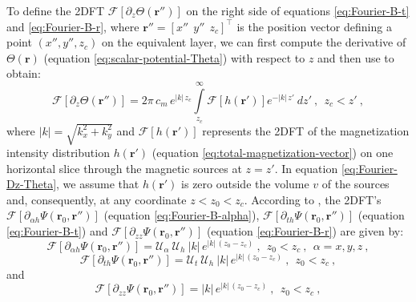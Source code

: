 To define the 2DFT $\mathcal{F}\left[ \partial_{z} \Theta(\mathbf{r}'') \right]$ 
on the right side of equations \ref{eq:Fourier-B-t} and \ref{eq:Fourier-B-r}, 
where $\mathbf{r}'' = \left[x'' \:\: y'' \:\: z_{c} \right]^{\top}$ is the 
position vector defining a point $(x'', y'', z_{c})$ on the equivalent layer, 
we can first compute the derivative of $\Theta(\mathbf{r})$ (equation
\ref{eq:scalar-potential-Theta}) with respect to $z$ and then use 
\citet[][ p. 297]{blakely1996} to obtain:
\begin{equation}
\mathcal{F}\left[ \partial_{z} \Theta(\mathbf{r}'') \right] 
= 2\pi \, c_{m} \, e^{|k| \, z_{c}} 
\int\limits_{z_{c}}^{\infty} 
\mathcal{F}\left[ h(\mathbf{r}') \right] e^{-|k| \, z'} \:
dz' \: , \:\: z_{c} < z' \: ,
\label{eq:Fourier-Dz-Theta}
\end{equation}
where $|k| = \sqrt{k_{x}^{2} + k_{y}^{2}}$ and 
$\mathcal{F}\left[ h(\mathbf{r}') \right]$ represents the 
2DFT of the magnetization intensity distribution $h(\mathbf{r}')$
(equation \ref{eq:total-magnetization-vector}) on one horizontal slice
through the magnetic sources at $z = z'$.
In equation \ref{eq:Fourier-Dz-Theta}, we assume that 
$h(\mathbf{r}')$ is zero outside the volume $v$ of the sources
and, consequently, at any coordinate $z < z_{0} < z_{c}$.
According to \citet[][ p. 278]{blakely1996}, the 2DFT's 
$\mathcal{F}\left[ \partial_{\alpha h} \Psi(\mathbf{r}_{0}, \mathbf{r}'') \right]$ 
(equation \ref{eq:Fourier-B-alpha}),
$\mathcal{F}\left[ \partial_{th} \Psi(\mathbf{r}_{0}, \mathbf{r}'') \right]$ 
(equation \ref{eq:Fourier-B-t}) and 
$\mathcal{F}\left[ \partial_{zz} \Psi(\mathbf{r}_{0}, \mathbf{r}'') \right]$ 
(equation \ref{eq:Fourier-B-r}) are given by:
\begin{equation}
\mathcal{F}\left[ \partial_{\alpha h} \Psi(\mathbf{r}_{0}, \mathbf{r}'') \right] = 
\mathcal{U}_{\alpha} \: \mathcal{U}_{h} \: |k| \, e^{|k| \, (z_{0} - z_{c})}
\: , \:\: z_{0} < z_{c} \: , \:\: \alpha = x, y, z \: ,
\label{eq:Fourier-Dalphah-Psi}
\end{equation}
\begin{equation}
\mathcal{F}\left[ \partial_{th} \Psi(\mathbf{r}_{0}, \mathbf{r}'') \right] = 
\mathcal{U}_{t} \: \mathcal{U}_{h} \: |k| \, e^{|k| \, (z_{0} - z_{c})}
\: , \:\: z_{0} < z_{c} \: ,
\label{eq:Fourier-Dth-Psi}
\end{equation}
and
\begin{equation}
\mathcal{F}\left[ \partial_{zz} \Psi(\mathbf{r}_{0}, \mathbf{r}'') \right] 
= |k| \, e^{|k| \, (z_{0} - z_{c})} \: ,
\:\: z_{0} < z_{c} \: ,
\label{eq:Fourier-Dzz-Psi}
\end{equation}
